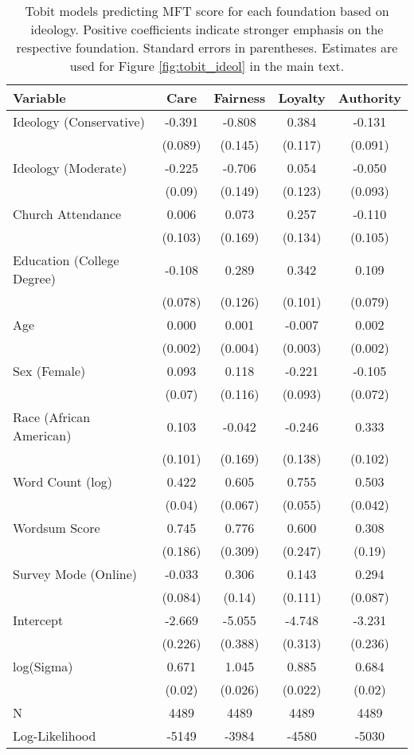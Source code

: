 \begin{table}[ht]
\centering
\caption[Tobit models predicting MFT score for each foundation based 
           on ideology]{Tobit models predicting MFT score for each foundation based 
           on ideology. Positive coefficients indicate stronger emphasis on the respective 
           foundation. Standard errors in parentheses. Estimates are used for Figure 
           \ref{fig:tobit_ideol} in the main text.} 
\label{tab:tobit_ideol}
\begingroup\footnotesize
\begin{tabular}{lcccc}
  \hline
Variable & Care & Fairness & Loyalty & Authority \\ 
  \hline
Ideology (Conservative) & -0.391 & -0.808 &  0.384 & -0.131 \\ 
   & (0.089) & (0.145) & (0.117) & (0.091) \\ 
  Ideology (Moderate) & -0.225 & -0.706 &  0.054 & -0.050 \\ 
   & (0.09) & (0.149) & (0.123) & (0.093) \\ 
  Church Attendance &  0.006 &  0.073 &  0.257 & -0.110 \\ 
   & (0.103) & (0.169) & (0.134) & (0.105) \\ 
  Education (College Degree) & -0.108 &  0.289 &  0.342 &  0.109 \\ 
   & (0.078) & (0.126) & (0.101) & (0.079) \\ 
  Age &  0.000 &  0.001 & -0.007 &  0.002 \\ 
   & (0.002) & (0.004) & (0.003) & (0.002) \\ 
  Sex (Female) &  0.093 &  0.118 & -0.221 & -0.105 \\ 
   & (0.07) & (0.116) & (0.093) & (0.072) \\ 
  Race (African American) &  0.103 & -0.042 & -0.246 &  0.333 \\ 
   & (0.101) & (0.169) & (0.138) & (0.102) \\ 
  Word Count (log) &  0.422 &  0.605 &  0.755 &  0.503 \\ 
   & (0.04) & (0.067) & (0.055) & (0.042) \\ 
  Wordsum Score &  0.745 &  0.776 &  0.600 &  0.308 \\ 
   & (0.186) & (0.309) & (0.247) & (0.19) \\ 
  Survey Mode (Online) & -0.033 &  0.306 &  0.143 &  0.294 \\ 
   & (0.084) & (0.14) & (0.111) & (0.087) \\ 
  Intercept & -2.669 & -5.055 & -4.748 & -3.231 \\ 
   & (0.226) & (0.388) & (0.313) & (0.236) \\ 
  log(Sigma) &  0.671 &  1.045 &  0.885 &  0.684 \\ 
   & (0.02) & (0.026) & (0.022) & (0.02) \\ 
   \hline
N & 4489 & 4489 & 4489 & 4489 \\ 
  Log-Likelihood & -5149 & -3984 & -4580 & -5030 \\ 
   \hline
\end{tabular}
\endgroup
\end{table}
